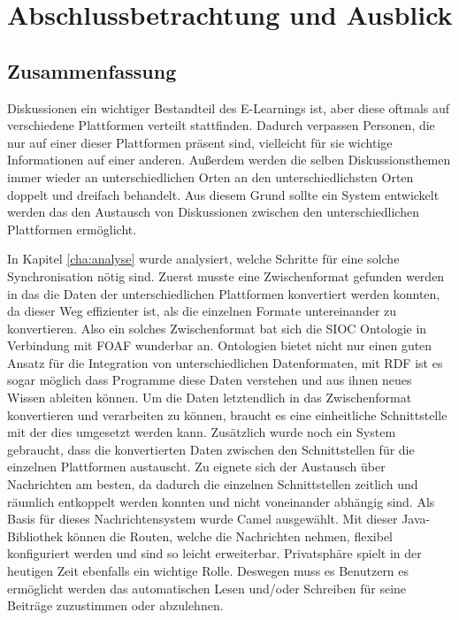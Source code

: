 
\chapter{Abschlussbetrachtung und Ausblick} %
\label{cha:zusammenfassung_und_ausblick}


\section{Zusammenfassung} %
\label{sec:zusammenfassung} 

Diskussionen ein wichtiger Bestandteil des E-Learnings ist, aber diese oftmals auf verschiedene Plattformen verteilt stattfinden. Dadurch verpassen Personen, die nur auf einer dieser Plattformen präsent sind, vielleicht für sie wichtige Informationen auf einer anderen. Außerdem werden die selben Diskussionsthemen immer wieder an unterschiedlichen Orten an den unterschiedlichsten Orten doppelt und dreifach behandelt. Aus diesem Grund sollte ein System entwickelt werden das den Austausch von Diskussionen zwischen den unterschiedlichen Plattformen ermöglicht. 

In Kapitel \ref{cha:analyse} wurde analysiert, welche Schritte für eine solche Synchronisation nötig sind. Zuerst musste eine Zwischenformat gefunden werden in das die Daten der unterschiedlichen Plattformen konvertiert werden konnten, da dieser Weg effizienter ist, als die einzelnen Formate untereinander zu konvertieren. Also ein solches Zwischenformat bat sich die SIOC Ontologie in Verbindung mit FOAF wunderbar an. Ontologien bietet nicht nur einen guten Ansatz für die Integration von unterschiedlichen Datenformaten, mit RDF ist es sogar möglich dass Programme diese Daten verstehen und aus ihnen neues Wissen ableiten können. Um die Daten letztendlich in das Zwischenformat konvertieren und verarbeiten zu können, braucht es eine einheitliche Schnittstelle mit der dies umgesetzt werden kann. Zusätzlich wurde noch ein System gebraucht, dass die konvertierten Daten zwischen den Schnittstellen für die einzelnen Plattformen austauscht. Zu eignete sich der Austausch über Nachrichten am besten, da dadurch die einzelnen Schnittstellen zeitlich und räumlich entkoppelt werden konnten und nicht voneinander abhängig sind. Als Basis für dieses Nachrichtensystem wurde Camel ausgewählt. Mit dieser Java-Bibliothek können die Routen, welche die Nachrichten nehmen, flexibel konfiguriert werden und sind so leicht erweiterbar. Privatsphäre spielt in der heutigen Zeit ebenfalls ein wichtige Rolle. Deswegen muss es Benutzern es ermöglicht werden das automatischen Lesen und/oder Schreiben für seine Beiträge zuzustimmen oder abzulehnen.

